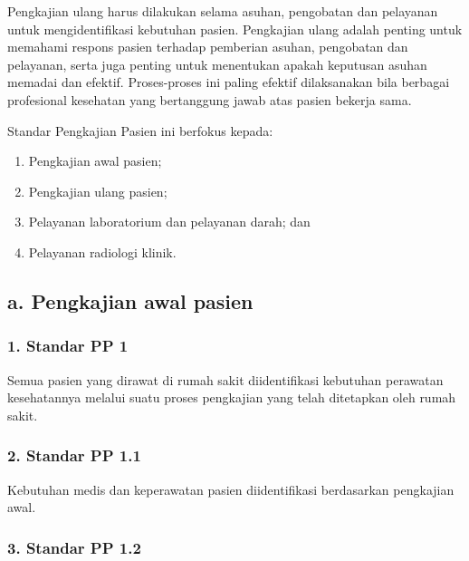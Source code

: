 \documentclass[
]{book}
\providecommand{\tightlist}{%
  \setlength{\itemsep}{0pt}\setlength{\parskip}{0pt}}
\begin{document}
Pengkajian ulang harus dilakukan selama asuhan, pengobatan dan pelayanan untuk mengidentifikasi kebutuhan pasien. Pengkajian ulang adalah penting untuk memahami respons pasien terhadap pemberian asuhan, pengobatan dan pelayanan, serta juga penting untuk menentukan apakah keputusan asuhan memadai dan efektif. Proses-proses ini paling efektif dilaksanakan bila berbagai profesional kesehatan yang bertanggung jawab atas pasien bekerja sama.

Standar Pengkajian Pasien ini berfokus kepada:

\begin{enumerate}
\def\labelenumi{\alph{enumi}.}
\tightlist
\item
  Pengkajian awal pasien;
\item
  Pengkajian ulang pasien;
\item
  Pelayanan laboratorium dan pelayanan darah; dan
\item
  Pelayanan radiologi klinik.
\end{enumerate}

\hypertarget{a.-pengkajian-awal-pasien}{%
\subsection*{a. Pengkajian awal pasien}\label{a.-pengkajian-awal-pasien}}

\hypertarget{standar-pp-1}{%
\subsubsection*{1. Standar PP 1}\label{standar-pp-1}}

Semua pasien yang dirawat di rumah sakit diidentifikasi kebutuhan perawatan kesehatannya melalui suatu proses pengkajian yang telah ditetapkan oleh rumah sakit.

\hypertarget{standar-pp-1.1}{%
\subsubsection*{2. Standar PP 1.1}\label{standar-pp-1.1}}

Kebutuhan medis dan keperawatan pasien diidentifikasi berdasarkan pengkajian awal.

\hypertarget{standar-pp-1.2}{%
\subsubsection*{3. Standar PP 1.2}\label{standar-pp-1.2}}
\end{document}
